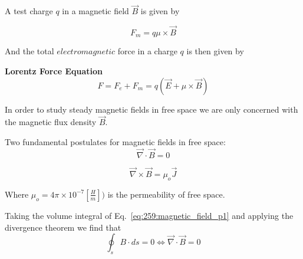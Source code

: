 \documentclass[10pt]{article}
\begin{document}
A test charge $ q $ in a magnetic field $ \vec{B} $ is given by

\begin{equation}
	F_m = q \mu \times \vec{B}
	\label{eq:259:magnetic_firce}
\end{equation}


And the total $ electromagnetic $ force in a charge $ q $ is then given by


\begin{definition}
	\textbf{Lorentz Force Equation} 
	\begin{equation}
		F = F_e + F_m = q(\vec{E} + \mu \times \vec{B})
		\label{eq:259:total_electromagnetic_force}
	\end{equation}
\end{definition}

In order to study steady magnetic fields in free space we are only concerned with the magnetic flux density $ \vec{B} $. 

\begin{theorem}
	Two fundamental postulates for magnetic fields in free space:
	\begin{equation}
		\vec{\nabla} \cdot \vec{B} = 0
		\label{eq:259:magnetic_field_p1}
	\end{equation}

	\begin{equation}
		\vec{\nabla} \times \vec{B} = \mu_o \vec{J}
		\label{eq:259:magnetic_field_p2}
	\end{equation}

	Where $ \mu_o = 4\pi \times  10^{-7} [\frac{H}{m}]) $ is the permeability of free space.

\end{theorem}



Taking the volume integral of Eq.~\ref{eq:259:magnetic_field_p1} and applying the divergence theorem we find that 
\begin{equation}
	\oint_s B \cdot ds = 0 \Leftrightarrow \vec{\nabla} \cdot \vec{B} = 0
	\label{eq:259:gauss_int-magnetic_flux_conservation}
\end{equation}
\end{document}
